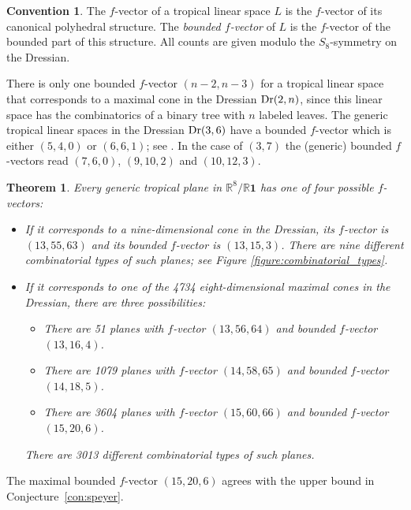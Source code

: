 \documentclass[11pt,a4paper]{amsart}
\theoremstyle{definition}
\newtheorem*{convention}{Convention}
\theoremstyle{plain}
\newtheorem{theorem}[definition]{Theorem}
\begin{document}
\begin{convention}
  The $f$-vector of a tropical linear space $L$ is the $f$-vector of its canonical polyhedral structure.
  The \emph{bounded $f$-vector} of $L$ is the $f$-vector of the bounded part of this structure. All counts are given modulo the $S_8$-symmetry on the Dressian.
\end{convention}

There is only one bounded $f$-vector $(n-2, n-3)$ for a tropical linear space that corresponds to a maximal cone in the Dressian ${\textnormal{Dr}}(2,n)$, since this linear space has the combinatorics of a binary tree with $n$ labeled leaves.
The generic tropical linear spaces in the Dressian ${\textnormal{Dr}}(3,6)$ have a bounded $f$-vector which is either $(5, 4, 0)$ or $(6, 6, 1)$; see \cite{HerrmannJensenJoswigSturmfels:2009}.
In the case of $(3,7)$ the (generic) bounded $f$-vectors read $(7,6,0)$, $(9, 10, 2)$ and $(10, 12, 3)$.

\begin{theorem}
 Every generic tropical plane in ${\mathbb{R}}^8/{\mathbb{R}}{{\mathbf 1}}$ has one of four possible $f$-vectors:
 \begin{itemize}
  \item[$\rhd$] If it corresponds to a nine-dimensional cone in the Dressian, its $f$-vector is $(13, 55, 63)$ and its bounded $f$-vector is $(13,15,3)$. There are nine different combinatorial types of such planes; see Figure \ref{figure:combinatorial_types}.
  \item[$\rhd$] If it corresponds to one of the 4734 eight-dimensional maximal cones in the Dressian, there are three possibilities:
  \begin{itemize}
   \item[$\circ$] There are 51 planes with $f$-vector $(13, 56, 64)$ and bounded $f$-vector $(13, 16, 4)$.
   \item[$\circ$] There are 1079 planes with $f$-vector $(14, 58, 65)$ and bounded $f$-vector $(14, 18, 5)$.
   \item[$\circ$] There are 3604 planes with $f$-vector $(15, 60, 66)$ and bounded $f$-vector $(15, 20, 6)$.
  \end{itemize}
  There are 3013 different combinatorial types of such planes.
 \end{itemize}
\end{theorem}

The maximal bounded $f$-vector $(15,20,6)$ agrees with the upper bound in Conjecture~\ref{con:speyer}.
\end{document}
